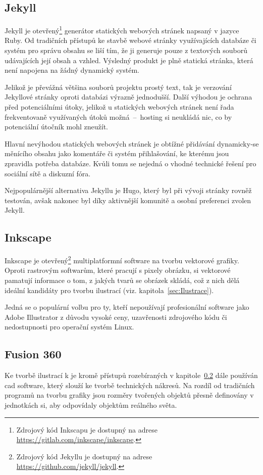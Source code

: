 \documentclass[a4paper, 12pt]{article}
\begin{document}
  \subsection{Jekyll} \label{sec:Jekyll}
  Jekyll je otevřený\footnote{Zdrojový kód Inkscapu je dostupný na adrese \url{https://gitlab.com/inkscape/inkscape}.} generátor statických webových stránek napsaný v jazyce Ruby. Od tradičních přístupů ke stavbě webové stránky využívajících databáze či systém pro správu obsahu se liší tím, že ji generuje pouze z textových souborů udávajících její obsah a vzhled. Výsledný produkt je plně statická stránka, která není napojena na žádný dynamický systém.

  Jelikož je převážná většina souborů projektu prostý text, tak je verzování Jekyllové stránky oproti databázi výrazně jednodušší. Další výhodou je ochrana před potenciálními útoky, jelikož u statických webových stránek není řada frekventovaně využívaných útoků možná~--~hosting si neukládá nic, co by potenciální útočník mohl zneužít.

  Hlavní nevýhodou statických webových stránek je obtížné přidávání dynamicky-se měnícího obsahu jako komentáře či systém přihlašování, ke kterému jsou zpravidla potřeba databáze. Kvůli tomu se nejedná o vhodné technické řešení pro sociální sítě a diskuzní fóra.

  Nejpopulárnější alternativa Jekyllu je Hugo, který byl při vývoji stránky rovněž testován, avšak nakonec byl díky aktivnější komunitě a osobní preferenci zvolen Jekyll.


  \subsection{Inkscape} \label{sec:Inkscape}
  Inkscape je otevřený\footnote{Zdrojový kód Jekyllu je dostupný na adrese \url{https://github.com/jekyll/jekyll}.} multiplatformní software na tvorbu vektorové grafiky. Oproti rastrovým softwarům, které pracují s  pixely obrázku, si vektorové pamatují informace o tom, z jakých tvarů se obrázek skládá, což z nich dělá ideální kandidáty pro tvorbu ilustrací (viz. kapitola~\ref{sec:Ilustrace}).

  Jedná se o populární volbu pro ty, kteří nepoužívají profesionální software jako Adobe Illustrator z důvodu vysoké ceny, uzavřenosti zdrojového kódu či nedostupnosti pro operační systém Linux.


  \subsection{Fusion 360} \label{sec:Fusion 360}
  Ke tvorbě ilustrací k je kromě přístupů rozebíraných v kapitole~\ref{sec:Inkscape} dále používán \gls{cad} software, který slouží ke tvorbě technických nákresů. Na rozdíl od tradičních programů na tvorbu grafiky jsou rozměry tvořených objektů přesně definovány v jednotkách \gls{si}, aby odpovídaly objektům reálného světa.
\end{document}
